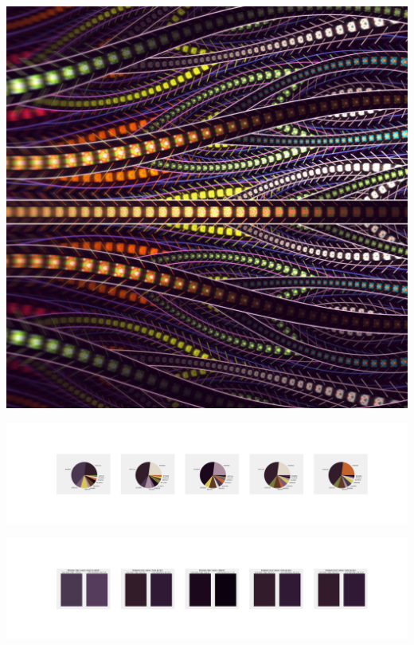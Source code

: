 \documentclass[11pt]{article}
\begin{document}
\begin{landscape}
    \begin{center}
    \includegraphics[width=\textwidth]{./nbimg/file (261).jpg}
    \end{center}

    \begin{center}
    \includegraphics[width=250mm]{./nbimg/pie-180.jpg}
    \end{center}

    \begin{center}
    \includegraphics[width=250mm]{./nbimg/peak-180.jpg}
    \end{center}
    


\end{landscape}
\end{document}
